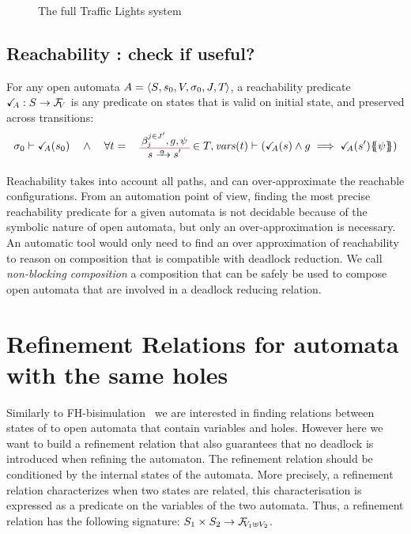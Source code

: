 \documentclass[runningheads]{llncs}
\begin{document}
\begin{figure}[!tb]
\centering
\scalebox{.75}{}
\caption{The full Traffic Lights system}
\label{fig:tlf}
\end{figure}
\subsection{Reachability : check if useful?}
\begin{definition}[Reachability] \label{Def:Reach}
For any open automata \(A = \OAg\), a reachability predicate \(\reach{A}: S \to \rformulas[V]\) is any predicate on states that is valid on initial state, and preserved across transitions:
\[\sigma_0 \vdash \reach{A}\mpar{s_0}\quad\land\quad\forall t = \OTg \in T, \fvars{t} \vdash \left(\reach{A}\mpar{s} \wedge g \implies \reach{A}\mpar{s'}\psubst{\psi}\right)\]
\end{definition}
Reachability takes into account all paths, and can over-approximate the reachable configurations. 
From an automation point of view, finding the most precise reachability predicate for a given automata is not decidable because of the symbolic nature of open automata, but only an over-approximation is necessary. An automatic tool would only need to find an over approximation of reachability to reason on composition that is compatible with deadlock reduction. We call \emph{non-blocking composition} a composition that can be safely be used to compose open automata that are involved in a deadlock reducing relation.

\section{Refinement Relations for automata with the same holes}\label{sec:refinement}

Similarly to FH-bisimulation~\cite{fhbisim} we are interested  in finding relations between states of to open automata that contain variables and holes. However here we want to build a refinement relation that  also guarantees that no deadlock is introduced when refining the automaton.
The refinement relation should be conditioned by the internal states of the automata. More precisely, a refinement relation characterizes when two states are related, this  characterisation is expressed as a predicate on the variables of the two automata.
Thus, a refinement relation has the following signature: \( S_1 \times S_2 \to \rformulas[V_1 \uplus V_2]\).

\end{document}
